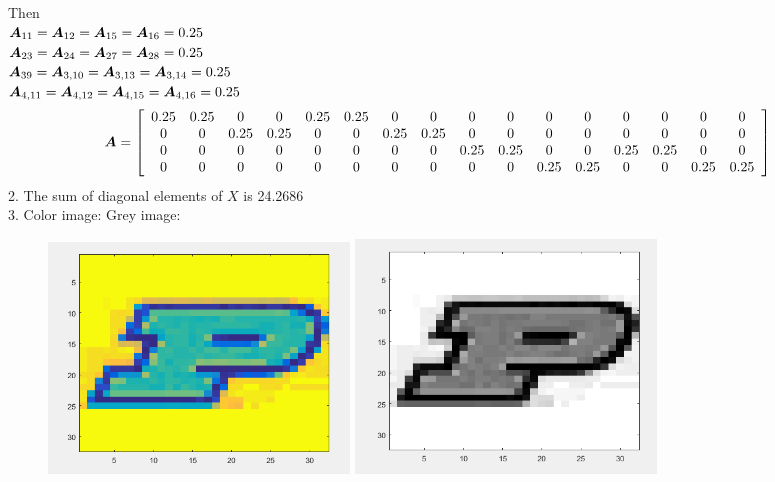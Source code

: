 \documentclass{article}
\begin{document}
Then\\ $ \boldsymbol{A}_{11}= \boldsymbol{A}_{12}= \boldsymbol{A}_{15}= \boldsymbol{A}_{16} = 0.25 $\\
$ \boldsymbol{A}_{23}= \boldsymbol{A}_{24}= \boldsymbol{A}_{27}= \boldsymbol{A}_{28} = 0.25 $\\
$ \boldsymbol{A}_{39}= \boldsymbol{A}_{3,10}= \boldsymbol{A}_{3,13}= \boldsymbol{A}_{3,14} = 0.25 $\\
$ \boldsymbol{A}_{4,11}= \boldsymbol{A}_{4,12}= \boldsymbol{A}_{4,15}= \boldsymbol{A}_{4,16} = 0.25 $\\

\begin{equation*}\boldsymbol{A}=
\left[
\begin{array}{cccccccccccccccc}
0.25 & 0.25 & 0 & 0 & 0.25 & 0.25 & 0 & 0 & 0 & 0 & 0 & 0 & 0 & 0 & 0 & 0  \\
0 & 0 & 0.25 & 0.25 & 0 & 0 & 0.25 & 0.25 & 0 & 0 & 0 & 0 & 0 & 0 & 0 & 0  \\
0 & 0 & 0 & 0 & 0 & 0 & 0 & 0 & 0.25 & 0.25 & 0 & 0 & 0.25 & 0.25 & 0 & 0 \\
0 & 0 & 0 & 0 & 0 & 0 & 0 & 0 & 0 & 0 & 0.25 & 0.25 & 0 & 0 & 0.25 & 0.25 \\
\end{array}
\right]
\end{equation*}
2. The sum of diagonal elements of $X$ is 24.2686  \\

3.  Color image:  
Grey image: 
\begin{figure} [h]
\includegraphics[width=8cm]{color}
\includegraphics[width=8cm]{gray}
\end{figure}
\end{document}
